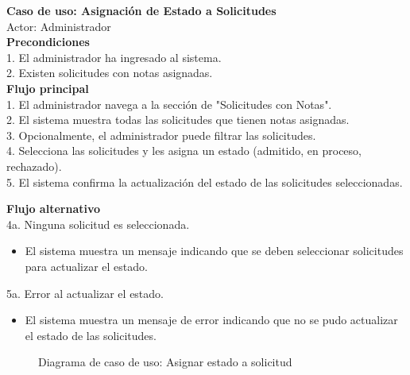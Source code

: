\documentclass[12pt,a4paper]{article}
\begin{document}
\begin{tcolorbox}[colback=white, colframe=black, rounded corners]
  {\Large \textbf{Caso de uso: Asignación de Estado a Solicitudes}} \\
  {\large Actor: Administrador} \vspace*{0.5cm} \\
  {{\large \textbf{Precondiciones}} \\
  1. El administrador ha ingresado al sistema. \\
  2. Existen solicitudes con notas asignadas.
  } \vspace*{0.5cm} \\
  {{\large \textbf{Flujo principal}} \\
  1. El administrador navega a la sección de "Solicitudes con Notas". \\
  2. El sistema muestra todas las solicitudes que tienen notas asignadas. \\
  3. Opcionalmente, el administrador puede filtrar las solicitudes. \\
  4. Selecciona las solicitudes y les asigna un estado (admitido, en proceso, rechazado). \\
  5. El sistema confirma la actualización del estado de las solicitudes seleccionadas.
  } \vspace*{0.5cm} \\
  {{\large \textbf{Flujo alternativo}} \\
  4a. Ninguna solicitud es seleccionada.
  \begin{itemize}
    \item El sistema muestra un mensaje indicando que se deben seleccionar solicitudes para actualizar el estado.
  \end{itemize}
  5a. Error al actualizar el estado.
  \begin{itemize}
    \item El sistema muestra un mensaje de error indicando que no se pudo actualizar el estado de las solicitudes.
  \end{itemize}
}
\end{tcolorbox}

\begin{figure}[H]
  \centering
  \caption{Diagrama de caso de uso: Asignar estado a solicitud}
  \label{fig:diagusoAsignarEstadoExamen}
\end{figure}
\end{document}

